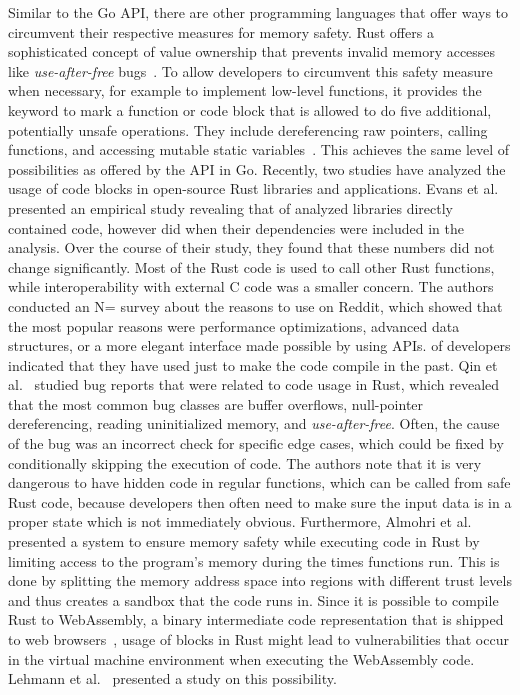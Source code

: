 Similar to the Go \unsafe{} \acrshort{API}, there are other programming languages that offer ways to circumvent their
respective measures for memory safety.
Rust offers a sophisticated concept of value ownership that prevents invalid memory accesses like
\textit{use-after-free} bugs~\cite{matsakis2014}.
To allow developers to circumvent this safety measure when necessary, for example to implement low-level functions, it
provides the \unsafe{} keyword to mark a function or code block that is allowed to do five additional, potentially
unsafe operations.
They include dereferencing raw pointers, calling \unsafe{} functions, and accessing mutable static
variables~\cite{matsakis2014}.
This achieves the same level of possibilities as offered by the \unsafe{} \acrshort{API} in Go.
Recently, two studies have analyzed the usage of \unsafe{} code blocks in open-source Rust libraries and applications.
Evans et al.~\cite{evans2020} presented an empirical study revealing that  of analyzed
libraries directly contained \unsafe{} code, however  did when their dependencies were included
in the analysis.
Over the course of their  study, they found that these numbers did not change significantly.
Most of the \unsafe{} Rust code is used to call other Rust functions, while interoperability with external C code was a
smaller concern.
The authors conducted an N= survey about the reasons to use \unsafe{} on Reddit, which showed that the most
popular reasons were performance optimizations, advanced data structures, or a more elegant interface made possible by
using \unsafe{} \acrshort{API}s.
 of developers indicated that they have used \unsafe{} just to make the code compile in the past.
Qin et al.~\cite{qin2020} studied bug reports that were related to \unsafe{} code usage in Rust, which revealed that the
most common bug classes are buffer overflows, null-pointer dereferencing, reading uninitialized memory, and
\textit{use-after-free}.
Often, the cause of the bug was an incorrect check for specific edge cases, which could be fixed by conditionally
skipping the execution of \unsafe{} code.
The authors note that it is very dangerous to have hidden \unsafe{} code in regular functions, which can be called from
safe Rust code, because developers then often need to make sure the input data is in a proper state which is not
immediately obvious.
Furthermore, Almohri et al.~\cite{almohri2018} presented a system to ensure memory safety while executing \unsafe{} code
in Rust by limiting access to the program's memory during the times \unsafe{} functions run.
This is done by splitting the memory address space into regions with different trust levels and thus creates a sandbox
that the \unsafe{} code runs in.
Since it is possible to compile Rust to WebAssembly, a binary intermediate code representation that is shipped to web
browsers~\cite{rourke2018}, usage of \unsafe{} blocks in Rust might lead to vulnerabilities that occur in the virtual
machine environment when executing the WebAssembly code.
Lehmann et al.~\cite{lehmann2020} presented a study on this possibility.

